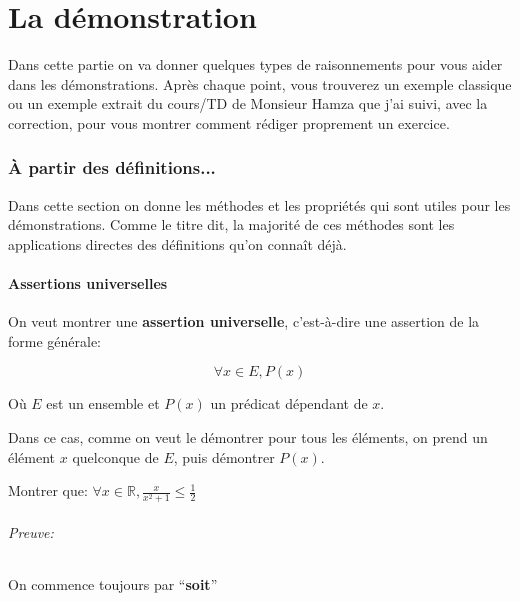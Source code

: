 \documentclass{article}
\begin{document}
\newpage
\part{La démonstration}

Dans cette partie on va donner quelques types de raisonnements pour vous aider dans les démonstrations. Après chaque point, vous trouverez un exemple classique ou un exemple extrait du cours/TD de Monsieur Hamza que j'ai suivi, avec la correction, pour vous montrer comment rédiger proprement un exercice.


\section{À partir des définitions...}

Dans cette section on donne les méthodes et les propriétés qui sont utiles pour les démonstrations. Comme le titre dit, la majorité de ces méthodes sont les applications directes des définitions qu'on connaît déjà.

\subsection{Assertions universelles}

On veut montrer une \textbf{assertion universelle}, c'est-à-dire une assertion de la forme générale:

\[
\forall x \in E, P(x)
\]

Où $E$ est un ensemble et $P(x)$ un prédicat dépendant de $x$.

\begin{tcolorbox}[colback=green!5!white,colframe=green!75!black,title=Point méthode 4.1]

Dans ce cas, comme on veut le démontrer pour tous les éléments, on prend un élément $x$ quelconque de $E$, puis démontrer $P(x)$. 

\end{tcolorbox}


\begin{tcolorbox}[colback=cyan!5!white,colframe=cyan!75!black,title=Exercice]

Montrer que: $\forall x \in \mathbb{R}, \frac{x}{x^{2}+1} \leq \frac{1}{2}$

\end{tcolorbox}

\paragraph{Preuve:} On commence toujours par ``\textbf{soit}''
\end{document}
